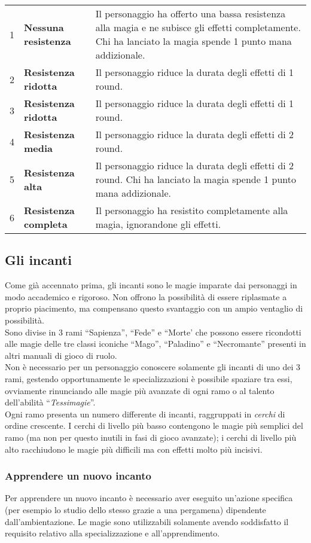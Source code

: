 \documentclass[../manuale_main.tex]{subfiles}
\begin{document}
\begin{tabularx}{\linewidth}{c l X}
1&\textbf{Nessuna resistenza}&Il personaggio ha offerto una bassa resistenza alla magia e ne subisce gli effetti completamente. Chi ha lanciato la magia spende 1 punto mana addizionale.\\
2&\textbf{Resistenza ridotta}&Il personaggio riduce la durata degli effetti di 1 round.\\
3&\textbf{Resistenza ridotta}&Il personaggio riduce la durata degli effetti di 1 round.\\
4&\textbf{Resistenza media}&Il personaggio riduce la durata degli effetti di 2 round.\\
5&\textbf{Resistenza alta}&Il personaggio riduce la durata degli effetti di 2 round. Chi ha lanciato la magia spende 1 punto mana addizionale.\\
6&\textbf{Resistenza completa}&Il personaggio ha resistito completamente alla magia, ignorandone gli effetti.\\
\end{tabularx}

\subsection{Gli incanti}
Come già accennato prima, gli incanti sono le magie imparate dai personaggi in modo accademico e rigoroso. Non offrono la possibilità di essere riplasmate a proprio piacimento, ma compensano questo svantaggio con un ampio ventaglio di possibilità.\\
Sono divise in 3 rami ``Sapienza'', ``Fede'' e ``Morte' che possono essere ricondotti alle magie delle tre classi iconiche ``Mago'', ``Paladino'' e ``Necromante'' presenti in altri manuali di gioco di ruolo.\\
Non è necessario per un personaggio conoscere solamente gli incanti di uno dei 3 rami, gestendo opportunamente le specializzazioni è possibile spaziare tra essi, ovviamente rinunciando alle magie più avanzate di ogni ramo o al talento dell'abilità ``\emph{Tessimagie}''.\\
Ogni ramo presenta un numero differente di incanti, raggruppati in \emph{cerchi} di ordine crescente. I cerchi di livello più basso contengono le magie più semplici del ramo (ma non per questo inutili in fasi di gioco avanzate); i cerchi di livello più alto racchiudono le magie più difficili ma con effetti molto più incisivi.



\subsubsection{Apprendere un nuovo incanto}
Per apprendere un nuovo incanto è necessario aver eseguito un'azione specifica (per esempio lo studio dello stesso grazie a una pergamena) dipendente dall'ambientazione.
Le magie sono utilizzabili solamente avendo soddisfatto il requisito relativo alla specializzazione e all'apprendimento.
\end{document}
